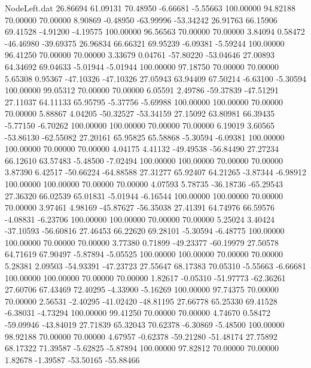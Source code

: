 \begin{filecontents}{NodeLeft.dat}
  26.86694   61.09131   70.48950    -6.66681   -5.55663  100.00000   94.82188   70.00000   70.00000    8.90869   -0.48950  -63.99996  -53.34242
  26.91763   66.15906   69.41528    -4.91200   -4.19575  100.00000   96.56563   70.00000   70.00000    3.84094    0.58472  -46.46980  -39.69375
  26.96834   66.66321   69.95239    -6.09381   -5.59244  100.00000   96.41250   70.00000   70.00000    3.33679    0.04761  -57.80220  -53.04646
  27.00893   64.34692   69.04633    -5.01944   -5.01944  100.00000   97.18750   70.00000   70.00000    5.65308    0.95367  -47.10326  -47.10326
  27.05943   63.94409   67.50214    -6.63100   -5.30594  100.00000   99.05312   70.00000   70.00000    6.05591    2.49786  -59.37839  -47.51291
  27.11037   64.11133   65.95795    -5.37756   -5.69988  100.00000  100.00000   70.00000   70.00000    5.88867    4.04205  -50.32527  -53.34159
  27.15092   63.80981   66.39435    -5.77150   -6.70262  100.00000  100.00000   70.00000   70.00000    6.19019    3.60565  -53.86130  -62.55082
  27.20161   65.95825   65.58868    -5.30594   -6.09381  100.00000  100.00000   70.00000   70.00000    4.04175    4.41132  -49.49538  -56.84490
  27.27234   66.12610   63.57483    -5.48500   -7.02494  100.00000  100.00000   70.00000   70.00000    3.87390    6.42517  -50.66224  -64.88588
  27.31277   65.92407   64.21265    -3.87344   -6.98912  100.00000  100.00000   70.00000   70.00000    4.07593    5.78735  -36.18736  -65.29543
  27.36320   66.02539   65.01831    -5.01944   -6.16544  100.00000  100.00000   70.00000   70.00000    3.97461    4.98169  -45.87627  -56.35038
  27.41391   64.74976   66.59576    -4.08831   -6.23706  100.00000  100.00000   70.00000   70.00000    5.25024    3.40424  -37.10593  -56.60816
  27.46453   66.22620   69.28101    -5.30594   -6.48775  100.00000  100.00000   70.00000   70.00000    3.77380    0.71899  -49.23377  -60.19979
  27.50578   64.71619   67.90497    -5.87894   -5.05525  100.00000  100.00000   70.00000   70.00000    5.28381    2.09503  -54.93391  -47.23723
  27.55647   68.17383   70.05310    -5.55663   -6.66681  100.00000  100.00000   70.00000   70.00000    1.82617   -0.05310  -51.97773  -62.36261
  27.60706   67.43469   72.40295    -4.33900   -5.16269  100.00000   97.74375   70.00000   70.00000    2.56531   -2.40295  -41.02420  -48.81195
  27.66778   65.25330   69.41528    -6.38031   -4.73294  100.00000   99.41250   70.00000   70.00000    4.74670    0.58472  -59.09946  -43.84019
  27.71839   65.32043   70.62378    -6.30869   -5.48500  100.00000   98.92188   70.00000   70.00000    4.67957   -0.62378  -59.21280  -51.48174
  27.75892   68.17322   71.39587    -5.62825   -5.87894  100.00000   97.82812   70.00000   70.00000    1.82678   -1.39587  -53.50165  -55.88466

\end{filecontents}
